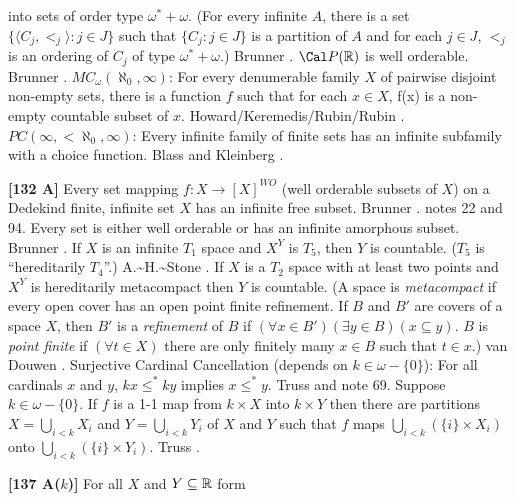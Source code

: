 into sets of order type $\omega^{*} + \omega$. (For every infinite $A$,
there is a set $\{\langle C_j,<_j \rangle: j\in J\}$ such that
$\{C_j: j\in J\}$ is a partition of $A$ and for each $j\in J$, $<_j$
is an ordering of $C_j$ of type $\omega^* + \omega$.)  \ac{Brunner}
\cite{1984f}.
\medskip
{} ${\Cal P}(\Bbb R)$ is well orderable. \ac{Brunner}
\cite{1984f}.
\medskip
{} $MC_\omega(\aleph_0,\infty)$: For every
denumerable family $X$ of pairwise disjoint non-empty sets, there is a
function $f$ such that for each $x\in X$, f(x) is a non-empty countable
subset of $x$. \ac{Howard/Keremedis/Rubin/Rubin} \cite{1998b}.
\medskip
{} $PC(\infty, <\aleph_0,\infty)$:  Every infinite
family of finite  sets has an infinite subfamily with a choice
function.  \ac{Blass} \cite{1977a} and \ac{Kleinberg} \cite{1969}.
\smallskip
\item{}{\bf [132 A]}  Every set mapping $f: X\rightarrow [X]^{WO}$ (well
orderable subsets of $X$) on a Dedekind finite, infinite set $X$ has
an infinite free subset.  \ac{Brunner} \cite{1989}. notes 22 and 94.
\medskip
{} Every set is either well orderable or has an
infinite amorphous subset.  \ac{Brunner} \cite{1982a}.
\medskip
{} If $X$ is an infinite $T_1$ space and $X^{Y}$
is $T_5$, then $Y$ is countable. ($T_5$ is ``hereditarily $T_4$''.)
\ac{A.~H.~Stone} \cite{1948}.
\medskip
{} If $X$ is a $T_2$ space with at least two points
and $X^{Y}$ is hereditarily metacompact then $Y$ is  countable. (A space
is {\it metacompact} if every open cover has an open point finite
refinement. If $B$ and $B'$ are covers of a space $X$, then $B'$ is a {\it
refinement} of $B$ if $(\forall x\in B')(\exists y\in B)(x\subseteq y)$.
$B$ is {\it point finite} if $(\forall t\in X)$ there are only finitely
many $x\in B$ such that $t\in x$.) van \ac{Douwen} \cite{1980}.
\medskip
{} Surjective Cardinal Cancellation (depends on
$k\in\omega-\{0\}$): For all cardinals $x$ and $y$, $kx\le^* ky$ implies
$x\le^* y$. \ac{Truss} \cite{1984} and note 69.
\medskip
{} Suppose $k\in\omega-\{0\}$. If $f$ is a 1-1
map from $k\times X$ into $k\times Y$ then there are partitions $X =
\bigcup^{}_{i<k} X_{i}$ and $Y = \bigcup^{}_{i<k} Y_{i}$ of $X$ and $Y$
such that $f$ maps $\bigcup^{}_{i<k} (\{i\} \times  X_{i})$ onto
$\bigcup^{}_{i<k} (\{i\} \times  Y_{i})$.  \ac{Truss} \cite{1984}.
\smallskip
\item{}{\bf [137 A($k$)]} For all $X$ and $Y\subseteq{\Bbb R}$ form
